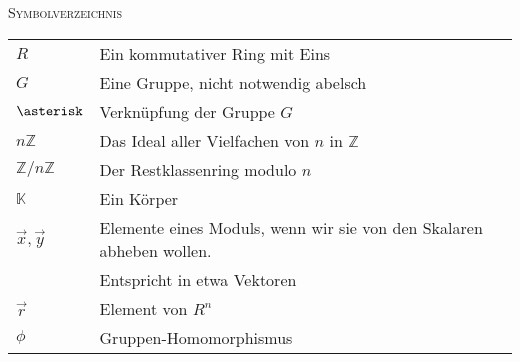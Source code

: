 \documentclass[a4paper]{amsart}
\theoremstyle{definition}
\newcommand{\Z}{\ensuremath{\mathbb{ Z }}}
\newcommand{\K}{\ensuremath{\mathbb{ K }}}
\newcommand{\zz}[1]{\ensuremath{\Z /#1\Z}}
\begin{document}
\begin{large}
    \centerline{\textsc{Symbolverzeichnis}}
\end{large}
\bigskip

\renewcommand*{\arraystretch}{1}

\begin{tabular}{ll}
    $R$                                 & Ein kommutativer Ring mit Eins\\
    $G$                                 & Eine Gruppe, nicht notwendig abelsch\\
    $\asterisk$                         & Verknüpfung der Gruppe $G$\\
    $n\Z$                               & Das Ideal aller Vielfachen von $n$ in $\Z$\\
    $\zz{n}$                            & Der Restklassenring modulo $n$\\
    $\K$                                & Ein Körper\\
    $\vec x, \vec y$                    & Elemente eines Moduls, wenn wir sie von den Skalaren abheben wollen. \\
                                        & Entspricht in etwa Vektoren\\
    $\vec r$                            & Element von $R^n$\\
    $\phi$                              & Gruppen-Homomorphismus
    
\end{tabular}
\end{document}

